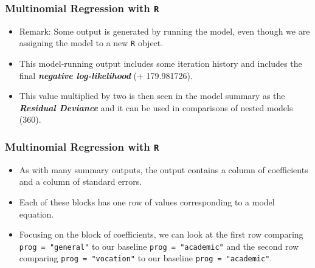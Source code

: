 \documentclass[00-GLMregslides.tex]{subfiles}
\begin{document}
\begin{frame}[fragile]

\frametitle{Multinomial Regression with \texttt{R}}
\Large
\begin{itemize}
\item Remark: Some output is generated by running the model, even though we are assigning the model to a new \texttt{R} object.
\item This model-running output includes some iteration history and includes the final \textbf{\textit{negative 
log-likelihood}} (+ 179.981726). 
\item This value multiplied by two is then seen in the model summary as the \textbf{\textit{Residual Deviance}} 
and it can be used in comparisons of nested models (360).
\end{itemize}
\end{frame}

\begin{frame}[fragile]
	
	\frametitle{Multinomial Regression with \texttt{R}}
	\Large
	\begin{itemize}




\item As with many summary outputs, the output contains a column of coefficients and a column of standard errors. 
\item Each of these blocks has one row of values corresponding to a model equation. 
\item Focusing on the block of coefficients, we can look at the first row comparing \texttt{prog = "general"} to our baseline \texttt{prog = "academic"} and the second row comparing \texttt{prog = "vocation"} to our baseline \texttt{prog = "academic"}. 
\end{itemize}
\end{frame}
\end{document}
